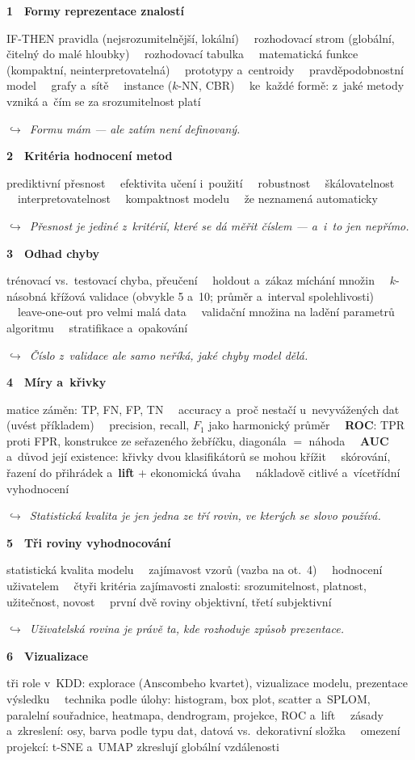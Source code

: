 \documentclass[11pt,a4paper]{article}
\newcommand{\tb}{\ \textcolor{defframe}{\textbullet}\ }
\newcommand{\blok}[2]{\par\addvspace{2.4mm}\noindent
  \textcolor{blokcol}{\textbf{#1}}\ \ \textbf{#2}\par\nobreak}
\newcommand{\tema}[1]{\par\nobreak\noindent #1\par}
\newcommand{\most}[1]{\par\nobreak\noindent
  {\small\itshape\textcolor{mostcol}{$\hookrightarrow$\ #1}}\par}
\begin{document}
\blok{1}{Formy reprezentace znalostí}
\tema{IF-THEN pravidla (nejsrozumitelnější, lokální) \tb rozhodovací strom (globální,
čitelný do malé hloubky) \tb rozhodovací tabulka \tb matematická funkce (kompaktní,
neinterpretovatelná) \tb prototypy a~centroidy \tb pravděpodobnostní model \tb grafy a~sítě
\tb instance ($k$-NN, CBR)
\tb ke~každé formě: z~jaké metody vzniká a~čím se za srozumitelnost platí}
\most{Formu mám --- ale  zatím není definovaný.}

\blok{2}{Kritéria hodnocení metod}
\tema{prediktivní přesnost \tb efektivita učení i~použití \tb robustnost \tb škálovatelnost
\tb interpretovatelnost \tb kompaktnost modelu
\tb že \uv{lepší} neznamená automaticky \uv{přesnější}}
\most{Přesnost je jediné z~kritérií, které se dá měřit číslem --- a~i~to jen nepřímo.}

\blok{3}{Odhad chyby}
\tema{trénovací vs.\ testovací chyba, přeučení
\tb holdout a~zákaz míchání množin
\tb $k$-násobná křížová validace (obvykle 5 a~10; průměr a~interval spolehlivosti)
\tb leave-one-out pro velmi malá data
\tb validační množina na ladění parametrů algoritmu
\tb stratifikace a~opakování}
\most{Číslo z~validace ale samo neříká, jaké chyby model dělá.}

\blok{4}{Míry a~křivky}
\tema{matice záměn: TP, FN, FP, TN
\tb accuracy a~proč nestačí u~nevyvážených dat (uvést příkladem)
\tb precision, recall, $F_1$ jako harmonický průměr
\tb \textbf{ROC}: TPR proti FPR, konstrukce ze seřazeného žebříčku, diagonála $=$ náhoda
\tb \textbf{AUC} a~důvod její existence: křivky dvou klasifikátorů se mohou křížit
\tb skórování, řazení do přihrádek a~\textbf{lift} $+$ ekonomická úvaha
\tb nákladově citlivé a~vícetřídní vyhodnocení}
\most{Statistická kvalita je jen jedna ze tří rovin, ve kterých se slovo
\uv{vyhodnocování} používá.}

\blok{5}{Tři roviny vyhodnocování}
\tema{statistická kvalita modelu \tb zajímavost vzorů (vazba na ot.~4) \tb hodnocení
uživatelem
\tb čtyři kritéria zajímavosti znalosti: srozumitelnost, platnost, užitečnost, novost
\tb první dvě roviny objektivní, třetí subjektivní}
\most{Uživatelská rovina je právě ta, kde rozhoduje způsob prezentace.}

\blok{6}{Vizualizace}
\tema{tři role v~KDD: explorace (Anscombeho kvartet), vizualizace modelu, prezentace
výsledku
\tb technika podle úlohy: histogram, box plot, scatter a~SPLOM, paralelní souřadnice,
heatmapa, dendrogram, projekce, ROC a~lift
\tb zásady a~zkreslení: osy, barva podle typu dat, datová vs.\ dekorativní složka
\tb omezení projekcí: t-SNE a~UMAP zkreslují globální vzdálenosti}
\end{document}
